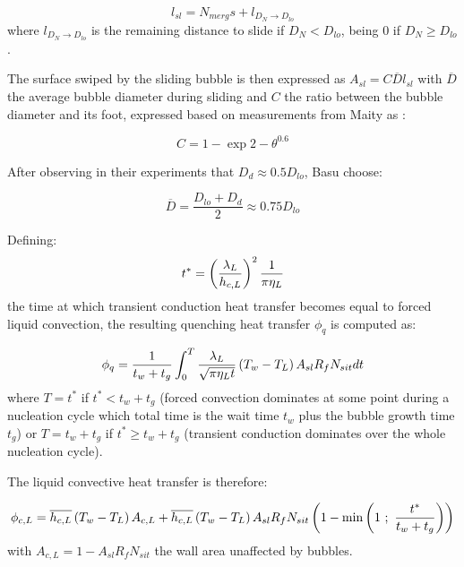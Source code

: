 \begin{equation}
l_{sl}=N_{merg}s + l_{D_{N}\rightarrow D_{lo}}
\end{equation}
where $l_{D_{N}\rightarrow D_{lo}}$ is the remaining distance to slide if $D_{N}<D_{lo}$, being $0$ if $D_{N} \geq D_{lo}$.

\npar

The surface swiped by the sliding bubble is then expressed as $A_{sl} = C\overline{D}l_{sl}$ with $\overline{D}$ the average bubble diameter during sliding and $C$ the ratio between the bubble diameter and its foot, expressed  based on measurements from Maity \cite{maity_effect_2000} as :

\begin{equation}
C=1-\exp{2-\theta ^{0.6}}
\end{equation}

After observing in their experiments that $D_{d}\approx 0.5D_{lo}$, Basu \etal choose:

\begin{equation}
\overline{D}=\frac{D_{lo}+D_{d}}{2}\approx 0.75D_{lo}
\end{equation}


Defining:
\begin{equation}
t^{*}=\left( \dfrac{\lambda_{L}}{h_{c,L}} \right)^{2} \dfrac{1}{\pi \eta_{L}}
\label{eq:basu_hfp_tstar}
\end{equation} the time at which transient conduction heat transfer becomes equal to forced liquid convection, the resulting quenching heat transfer $\phi_{q}$ is computed as:

\begin{equation}
\phi_{q} = \frac{1}{t_{w}+t_{g}} \int_{0}^{T}\frac{\lambda_{L}}{\sqrt{\pi \eta_{L}t}}\left( T_{w}-T_{L} \right)A_{sl}R_{f}N_{sit}dt
\end{equation}
where $T=t^{*}$ if $t^{*}<t_{w}+t_{g}$ (forced convection dominates at some point during a nucleation cycle which total time is the wait time $t_{w}$ plus the bubble growth time $t_{g}$) or $T=t_{w}+t_{g}$ if $t^{*}\geq t_{w}+t_{g}$ (transient conduction dominates over the whole nucleation cycle).

\npar
The liquid convective heat transfer is therefore:

\begin{equation}
\phi_{c,L} = \overline{h_{c,L}}\parth{T_{w}-T_{L}}A_{c,L} + \overline{h_{c,L}}\parth{T_{w}-T_{L}}A_{sl}R_{f}N_{sit}\parth{1-\mathrm{min}\parth{1\ ;\ \frac{t^{*}}{t_{w}+t_{g}}}}
\label{eq:basu_hfp_phicL}
\end{equation}
with $A_{c,L} = 1 - A_{sl}R_{f}N_{sit}$ the wall area unaffected by bubbles.

